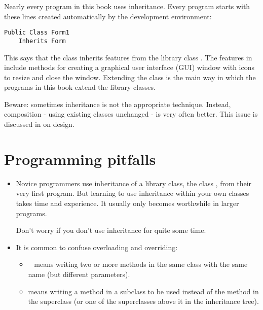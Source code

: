 		Nearly every program in this book uses inheritance. Every program starts with these lines created automatically by the development environment:
		\begin{lstlisting}
Public Class Form1
	Inherits Form
		\end{lstlisting}
		This says that the class  inherits features from the library class . The features in  include methods for creating a graphical user interface (GUI) window with icons to resize and close the window. Extending the class  is the main way in which the programs in this book extend the library classes.
		
		Beware: sometimes inheritance is not the appropriate technique. Instead, composition - using existing classes unchanged - is very often better. This issue is discussed in on design.


	\section{Programming pitfalls}
		\begin{itemize}
			\item Novice programmers use inheritance of a library class, the class , from their very first program. But learning to use inheritance within your own classes takes time and experience. It usually only becomes worthwhile in larger programs. 
				
				Don't worry if you don't use inheritance for quite some time.
      \item It is common to confuse overloading and overriding:
				\begin{itemize}
					\item  means writing two or more methods in the same class with the same name (but different parameters).
					\item	{} means writing a method in a subclass to be used instead of the method in the superclass (or one of the superclasses above it in the inheritance tree).
				\end{itemize}
		\end{itemize}


